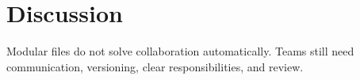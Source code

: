 

\section{Discussion}
Modular files do not solve collaboration automatically. Teams still need communication,
versioning, clear responsibilities, and review.
